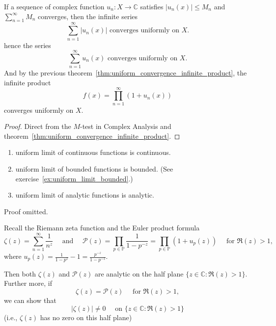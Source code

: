 \documentclass{elegantbook}
\begin{document}
\begin{theorem} \label{thm:weierstrass_m_test_infinite_product}
  If a sequence of complex function $u_n:X\to\mathbb{C}$ satisfies $|u_n(x)| \leq M_n$ and $\sum_{n=1}^{\infty} M_n$ converges, then the infinite series
  \[
    \sum_{n=1}^{\infty} |u_n(x)| \text{ converges uniformly on } X.
  \]
  hence the series
  \[
    \sum_{n=1}^{\infty} u_n(x) \text{ converges uniformly on } X.
  \]
  And by the previous theorem~\ref{thm:uniform_convergence_infinite_product}, the infinite product
  \[
    f(x) = \prod_{n=1}^{\infty} (1 + u_n(x))
  \]
  converges uniformly on $X$.
\end{theorem}

\begin{proof}
  Direct from the $M$-test in Complex Analysis and theorem~\ref{thm:uniform_convergence_infinite_product}.
\end{proof}

\begin{proposition} \label{prop:properties_uniform_convergence}
  \begin{enumerate}
    \item uniform limit of continuous functions is continuous.
    \item uniform limit of bounded functions is bounded. (See exercise~\ref{ex:uniform_limit_bounded}.)
    \item uniform limit of analytic functions is analytic.
  \end{enumerate}
\end{proposition}

Proof omitted.

\begin{corollary} \label{cor:analyticity_zeta_euler_product}
  Recall the Riemann zeta function and the Euler product formula
  \[
    \zeta(z)=\sum_{n=1}^{\infty}\frac{1}{n^z} \quad \text{ and } \quad \mathcal{P}(z)=\prod_{p\in\mathbb{P}}\frac{1}{1-p^{-z}}=\prod_{p\in\mathbb{P}}(1+u_p(z)) \quad \text{ for } \Re(z)>1,
  \]
  where $u_p(z)=\frac{1}{1-p^{z}}-1=\frac{p^{-z}}{1-p^{-z}}$.

  Then both $\zeta(z)$ and $\mathcal{P}(z)$ are analytic on the half plane $\{z\in\mathbb{C}:\Re(z)>1\}$. Further more, if
  \[
    \zeta(z) = \mathcal{P}(z) \quad \text{ for } \Re(z)>1,
  \]
  we can show that 
  \[
  |\zeta(z)|\ne0 \quad \text{ on } \{z\in\mathbb{C}:\Re(z)>1\}
  \]
  (i.e., $\zeta(z)$ has no zero on this half plane)

\end{corollary}
\end{document}
